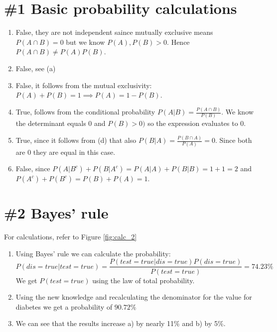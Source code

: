 \documentclass{article}
\begin{document}
	
\section*{\#1 Basic probability calculations}

\begin{enumerate}[label=\alph*)]
	\item False, they are not independent saince mutually exclusive means $P(A\cap B) = 0$ but we know $P(A),P(B) > 0$. Hence $P(A\cap B) \neq P(A)P(B)$.
	\item False, see (a)
	\item False, it follows from the mutual exclusivity: $ P(A) + P(B) = 1 \implies P(A) = 1- P(B)$. 
	\item True, follows from the conditional probability $P(A|B) = \frac{P(A\cap B)}{P(B)}$. We know the determinant equals 0 and $P(B)>0)$ so the expression evaluates to 0.
	\item True, since it follows from (d) that also $P(B|A) = \frac{P(B\cap A)}{P(A)} = 0$. Since both are 0 they are equal in this case.
	\item False, since $P(A|B^c) + P(B|A^c) = P(A|A) + P(B|B)= 1+1=2$ and $P(A^c)+P(B^c)=P(B)+P(A)=1$. 
\end{enumerate}

\section*{\#2 Bayes' rule}
For calculations, refer to Figure \ref{fig:calc_2}
\begin{enumerate}[label=\alph*)]
	\item Using Bayes' rule we can calculate the probability:
	\begin{equation}
		P(dis=true|test=true) = \frac{P(test=true|dis=true)P(dis=true)}{P(test=true)} = 74.23\%
	\end{equation}
	We get $P(test=true)$ using the law of total probability.
	\item Using the new knowledge and recalculating the denominator for the value for diabetes we get a probability of $90.72\%$
	\item We can see that the results increase a) by nearly 11\% and b) by 5\%. 
\end{enumerate}
\end{document}

